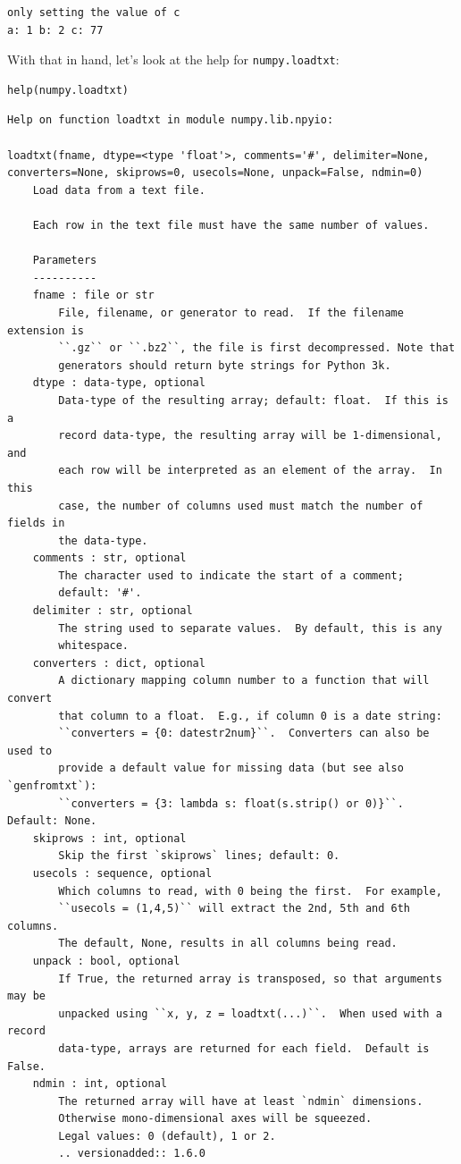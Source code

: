 \documentclass{book}
\begin{document}
\begin{verbatim}
only setting the value of c
a: 1 b: 2 c: 77
\end{verbatim}

With that in hand, let's look at the help for \texttt{numpy.loadtxt}:

\begin{verbatim}
help(numpy.loadtxt)
\end{verbatim}

\begin{verbatim}
Help on function loadtxt in module numpy.lib.npyio:

loadtxt(fname, dtype=<type 'float'>, comments='#', delimiter=None, converters=None, skiprows=0, usecols=None, unpack=False, ndmin=0)
    Load data from a text file.

    Each row in the text file must have the same number of values.

    Parameters
    ----------
    fname : file or str
        File, filename, or generator to read.  If the filename extension is
        ``.gz`` or ``.bz2``, the file is first decompressed. Note that
        generators should return byte strings for Python 3k.
    dtype : data-type, optional
        Data-type of the resulting array; default: float.  If this is a
        record data-type, the resulting array will be 1-dimensional, and
        each row will be interpreted as an element of the array.  In this
        case, the number of columns used must match the number of fields in
        the data-type.
    comments : str, optional
        The character used to indicate the start of a comment;
        default: '#'.
    delimiter : str, optional
        The string used to separate values.  By default, this is any
        whitespace.
    converters : dict, optional
        A dictionary mapping column number to a function that will convert
        that column to a float.  E.g., if column 0 is a date string:
        ``converters = {0: datestr2num}``.  Converters can also be used to
        provide a default value for missing data (but see also `genfromtxt`):
        ``converters = {3: lambda s: float(s.strip() or 0)}``.  Default: None.
    skiprows : int, optional
        Skip the first `skiprows` lines; default: 0.
    usecols : sequence, optional
        Which columns to read, with 0 being the first.  For example,
        ``usecols = (1,4,5)`` will extract the 2nd, 5th and 6th columns.
        The default, None, results in all columns being read.
    unpack : bool, optional
        If True, the returned array is transposed, so that arguments may be
        unpacked using ``x, y, z = loadtxt(...)``.  When used with a record
        data-type, arrays are returned for each field.  Default is False.
    ndmin : int, optional
        The returned array will have at least `ndmin` dimensions.
        Otherwise mono-dimensional axes will be squeezed.
        Legal values: 0 (default), 1 or 2.
        .. versionadded:: 1.6.0


\end{verbatim}
\end{document}
